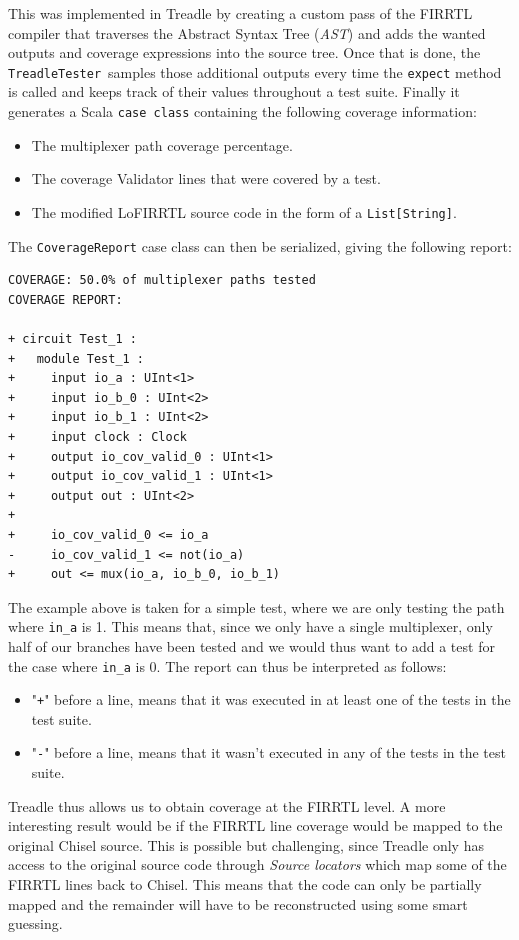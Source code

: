 \documentclass[conference]{IEEEtran}
\begin{document}
This was implemented in Treadle by creating a custom pass of the FIRRTL compiler that traverses the Abstract Syntax Tree (\textit{AST}) and adds the wanted outputs and coverage expressions into the source tree. Once that is done, the \texttt{TreadleTester} samples those additional outputs every time the \texttt{expect} method is called and keeps track of their values throughout a test suite. Finally it generates a Scala \texttt{case class} containing the following coverage information:
\begin{itemize}
\item The multiplexer path coverage percentage.
\item The coverage Validator lines that were covered by a test.
\item The modified LoFIRRTL source code in the form of a \texttt{List[String]}.
\end{itemize}
The \texttt{CoverageReport} case class can then be serialized, giving the following report:
\begin{verbatim}
COVERAGE: 50.0% of multiplexer paths tested
COVERAGE REPORT:

+ circuit Test_1 :
+   module Test_1 :
+     input io_a : UInt<1>
+     input io_b_0 : UInt<2>
+     input io_b_1 : UInt<2>
+     input clock : Clock
+     output io_cov_valid_0 : UInt<1>
+     output io_cov_valid_1 : UInt<1>
+     output out : UInt<2>
+   
+     io_cov_valid_0 <= io_a
-     io_cov_valid_1 <= not(io_a)
+     out <= mux(io_a, io_b_0, io_b_1)
\end{verbatim}
The example above is taken for a simple test, where we are only testing the path where \texttt{in\_a} is 1. This means that, since we only have a single multiplexer, only half of our branches have been tested and we would thus want to add a test for the case where \texttt{in\_a} is 0. The report can thus be interpreted as follows:  
\begin{itemize}
\item "\texttt{+}" before a line, means that it was executed in at least one of the tests in the test suite.
\item "\texttt{-}" before a line, means that it wasn't executed in any of the tests in the test suite.\\
\end{itemize}

Treadle thus allows us to obtain coverage at the FIRRTL level. A more interesting result would be if the FIRRTL line coverage would be mapped to the original Chisel source. This is possible but challenging, since Treadle only has access to the original source code through \textit{Source locators} which map some of the FIRRTL lines back to Chisel. This means that the code can only be partially mapped and the remainder will have to be reconstructed using some smart guessing.\\
\end{document}
